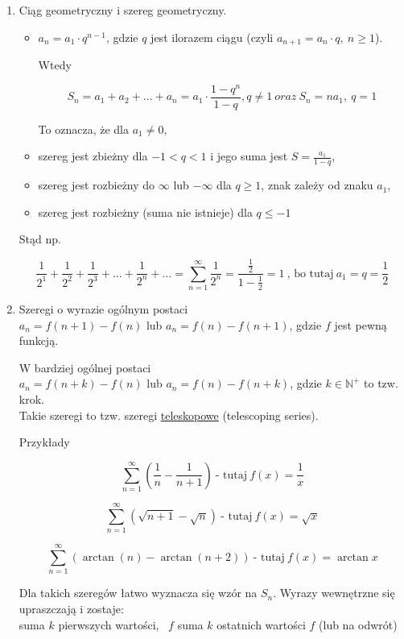 \begin{enumerate}
    \item Ciąg geometryczny i szereg geometryczny.
    \begin{itemize}
        \item 
        $ a_n = a_1 \cdot q^{n-1} $, gdzie $q$ jest ilorazem ciągu (czyli $a_{n+1} = a_n \cdot q , \ n \geq 1$).
        
        Wtedy

        $$ S_n = a_1 + a_2 + ... + a_n = a_1 \cdot \frac{1 - q^n}{1 - q}, q \neq 1 \ oraz \ S_n = na_1, \ q = 1 $$

        To oznacza, że dla $ a_1 \neq 0 $,

        \item szereg jest zbieżny dla $ -1 < q < 1 $ i jego suma jest $ S = \frac{a_1}{1 - q} $,
        \item szereg jest rozbieżny do $\infty$ lub $-\infty$ dla $ q \geq 1 $, znak zależy od znaku $a_1$,
        \item szereg jest rozbieżny (suma nie istnieje) dla $ q \leq -1 $ \\
    \end{itemize}

    Stąd np.

    $$ \frac{1}{2^1} + \frac{1}{2^2} + \frac{1}{2^3} + ... + \frac{1}{2^n} + ... = \sum\limits_{n = 1}^{\infty} \frac{1}{2^n} =
    \frac{ \frac{1}{2} }{ 1 - \frac{1}{2} } = 1 \ \textrm{, bo tutaj} \ a_1 = q = \frac{1}{2} $$

    \item Szeregi o wyrazie ogólnym postaci \\
    $ a_n = f(n + 1) - f(n)$ lub $ a_n = f(n) - f(n + 1) $, gdzie $f$ jest pewną funkcją.

    W bardziej ogólnej postaci \\
    \quad $ a_n = f(n + k) - f(n) $ lub $ a_n = f(n) - f(n + k) $, gdzie $ k \in \mathbb{N}^+ $ to tzw. krok. \\
    
    Takie szeregi to tzw. szeregi \underline{teleskopowe} (telescoping series).

    Przykłady

    $$ \sum\limits_{n = 1}^{\infty} \left( \frac{1}{n} - \frac{1}{n + 1} \right) \ \textrm{- tutaj} \ f(x) = \frac{1}{x} $$

    $$ \sum\limits_{n = 1}^{\infty} \left( \sqrt{n + 1} - \sqrt{n} \right) \ \textrm{- tutaj} \ f(x) = \sqrt{x} $$

    $$ \sum\limits_{n = 1}^{\infty} \left( \arctan(n) - \arctan(n+2) \right) \ \textrm{- tutaj} \ f(x) = \arctan x $$

    Dla takich szeregów łatwo wyznacza się wzór na $S_n$. Wyrazy wewnętrzne się upraszczają i zostaje: \\
    suma $k$ pierwszych wartości, \ $f$ suma $k$ ostatnich wartości $f$ (lub na odwrót) \\

\end{enumerate}

